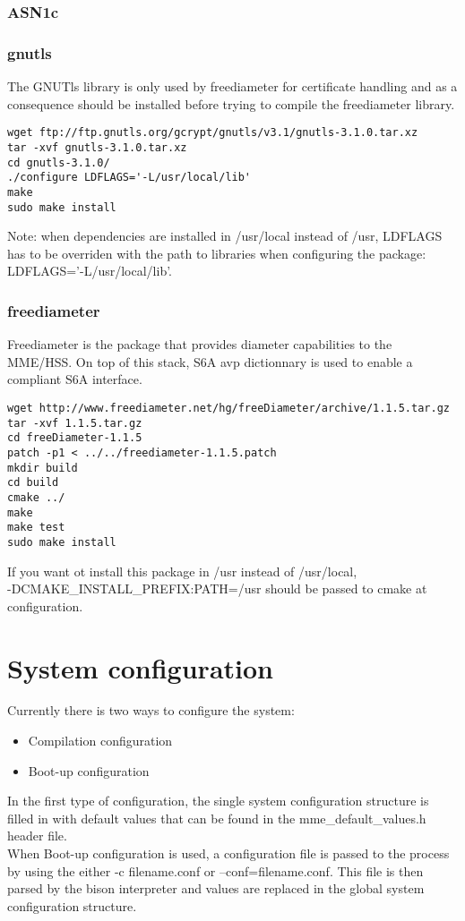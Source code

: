 \documentclass[a4paper,oneside]{report}
\begin{document}
\subsection{ASN1c}
\label{sec:asn1c}

\subsection{gnutls}
\label{sec:gnutls}

The GNUTls library is only used by freediameter for certificate handling and as a
consequence should be installed before trying to compile the freediameter library.
\begin{lstlisting}
wget ftp://ftp.gnutls.org/gcrypt/gnutls/v3.1/gnutls-3.1.0.tar.xz
tar -xvf gnutls-3.1.0.tar.xz
cd gnutls-3.1.0/
./configure LDFLAGS='-L/usr/local/lib'
make
sudo make install
\end{lstlisting}
Note: when dependencies are installed in /usr/local instead of /usr,
LDFLAGS has to be overriden with the path to libraries when configuring the package:
LDFLAGS='-L/usr/local/lib'.

\subsection{freediameter}
\label{sec:freediameter}
Freediameter is the package that provides diameter capabilities to the MME/HSS.
On top of this stack, S6A avp dictionnary is used to enable a compliant S6A interface.
\begin{lstlisting}
wget http://www.freediameter.net/hg/freeDiameter/archive/1.1.5.tar.gz
tar -xvf 1.1.5.tar.gz
cd freeDiameter-1.1.5
patch -p1 < ../../freediameter-1.1.5.patch
mkdir build
cd build
cmake ../
make
make test
sudo make install
\end{lstlisting}
If you want ot install this package in /usr instead of /usr/local,\\
-DCMAKE\_INSTALL\_PREFIX:PATH=/usr should be passed to cmake at configuration.

\chapter*{System configuration} 

Currently there is two ways to configure the system:
\begin{itemize}
 \item Compilation configuration
 \item Boot-up configuration
\end{itemize}
In the first type of configuration, the single system configuration structure
is filled in with default values that can be found in the mme\_default\_values.h
header file.\\
When Boot-up configuration is used, a configuration file is passed to the process
by using the either -c filename.conf or --conf=filename.conf. This file is then parsed
by the bison interpreter and values are replaced in the global system configuration
structure.
\end{document}
